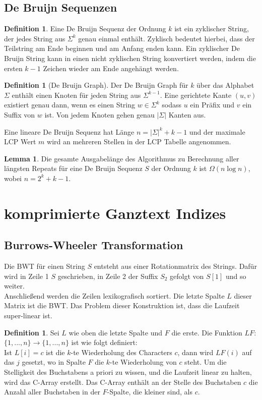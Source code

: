 \documentclass[a4paper, 12pt]{article}
\theoremstyle{plain}
\theoremstyle{definition}
\newtheorem{definition}[theorem]{Definition} %
\theoremstyle{lemma}
\newtheorem{lemma}[theorem]{Lemma}
\theoremstyle{remark}
\theoremstyle{corollary}
\theoremstyle{example}
\begin{document}
	\subsection{De Bruijn Sequenzen}
	\begin{definition}
		Eine De Bruijn Sequenz der Ordnung $k$ ist ein zyklischer String, der jedes String aus $\Sigma^k$ genau einmal enthält. Zyklisch bedeutet hierbei, dass der Teilstring am Ende beginnen und am Anfang enden kann. Ein zyklischer De Bruijn String kann in einen nicht zyklischen String konvertiert werden, indem die ersten $k-1$ Zeichen wieder am Ende angehängt werden.
	\end{definition}
	\begin{definition}[De Bruijn Graph]
		Der De Bruijn Graph für $k$ über das Alphabet $\Sigma$ enthält einen Knoten für jeden String aus $\Sigma^{k-1}$. Eine gerichtete Kante $(u,v)$ existiert genau dann, wenn es einen String $w \in \Sigma^k$ sodass $u$ ein Präfix und $v$ ein Suffix von $w$ ist. Von jedem Knoten gehen genau $\left|\Sigma\right|$ Kanten aus.
	\end{definition}
	Eine lineare De Bruijn Sequenz hat Länge $n=\left|\Sigma\right|^k+k-1$ und der maximale LCP Wert $m$ wird an mehreren Stellen in der LCP Tabelle angenommen. 
	\begin{lemma}
		Die gesamte Ausgabelänge des Algorithmus zu Berechnung aller längsten Repeats für eine De Bruijn Sequenz $S$ der Ordnung $k$ ist $\Omega(n\log n)$, wobei $n = 2^k+k-1$.
	\end{lemma}
	\section{komprimierte Ganztext Indizes}
	\subsection{Burrows-Wheeler Transformation}
	Die BWT für einen String $S$ entsteht aus einer Rotationmatrix des Strings. Dafür wird in Zeile 1 $S$ geschrieben, in Zeile 2 der Suffix $S_2$ gefolgt von $S[1]$ und so weiter.\\
	Anschließend werden die Zeilen lexikografisch sortiert. Die letzte Spalte $L$ dieser Matrix ist die BWT. Das Problem dieser Konstruktion ist, dass die Laufzeit super-linear ist.
	\begin{definition}
		Sei $L$ wie oben die letzte Spalte und $F$ die erste.
		Die Funktion $LF$: $\{1,...,n\} \to \{1,...,n\}$ ist wie folgt definiert:\\
		Ist $L[i] = c$ ist die $k$-te Wiederholung des Characters $c$, dann wird $LF(i)$ auf das $j$ gesetzt, wo in Spalte $F$ die $k$-te Wiederholung von $c$ steht. Um die Stelligkeit des Buchstabens a priori zu wissen, und die Laufzeit linear zu halten, wird das C-Array erstellt. Das C-Array enthält an der Stelle des Buchstaben $c$ die Anzahl aller Buchstaben in der $F$-Spalte, die kleiner sind, als $c$.
	\end{definition}
\end{document}
